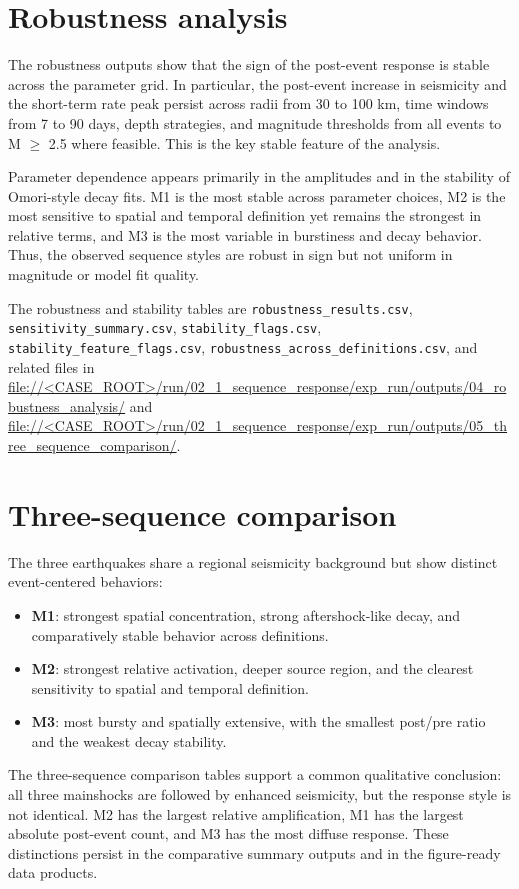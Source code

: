 \documentclass[11pt]{article}
\begin{document}
\section{Robustness analysis}
The robustness outputs show that the sign of the post-event response is stable across the parameter grid. In particular, the post-event increase in seismicity and the short-term rate peak persist across radii from 30 to 100 km, time windows from 7 to 90 days, depth strategies, and magnitude thresholds from all events to M $\geq$ 2.5 where feasible. This is the key stable feature of the analysis.

Parameter dependence appears primarily in the amplitudes and in the stability of Omori-style decay fits. M1 is the most stable across parameter choices, M2 is the most sensitive to spatial and temporal definition yet remains the strongest in relative terms, and M3 is the most variable in burstiness and decay behavior. Thus, the observed sequence styles are robust in sign but not uniform in magnitude or model fit quality.

The robustness and stability tables are \texttt{robustness\_results.csv}, \texttt{sensitivity\_summary.csv}, \texttt{stability\_flags.csv}, \texttt{stability\_feature\_flags.csv}, \texttt{robustness\_across\_definitions.csv}, and related files in \url{file://<CASE_ROOT>/run/02_1_sequence_response/exp_run/outputs/04_robustness_analysis/} and \url{file://<CASE_ROOT>/run/02_1_sequence_response/exp_run/outputs/05_three_sequence_comparison/}.

\section{Three-sequence comparison}
The three earthquakes share a regional seismicity background but show distinct event-centered behaviors:
\begin{itemize}[leftmargin=1.2em]
    \item \textbf{M1}: strongest spatial concentration, strong aftershock-like decay, and comparatively stable behavior across definitions.
    \item \textbf{M2}: strongest relative activation, deeper source region, and the clearest sensitivity to spatial and temporal definition.
    \item \textbf{M3}: most bursty and spatially extensive, with the smallest post/pre ratio and the weakest decay stability.
\end{itemize}

The three-sequence comparison tables support a common qualitative conclusion: all three mainshocks are followed by enhanced seismicity, but the response style is not identical. M2 has the largest relative amplification, M1 has the largest absolute post-event count, and M3 has the most diffuse response. These distinctions persist in the comparative summary outputs and in the figure-ready data products.
\end{document}
